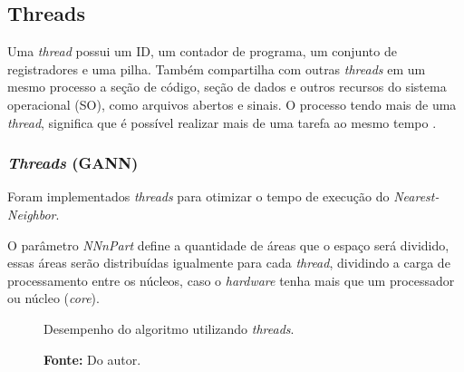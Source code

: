 \documentclass[12pt,openright,a4paper,twoside]{tcc}
\begin{document}
		\subsection{Threads}

		Uma \textit{thread} possui um ID, um contador de programa, um conjunto de registradores e uma pilha. Também compartilha com outras \textit{threads} em um mesmo processo a seção de código, seção de dados e outros recursos do sistema operacional (SO), como arquivos abertos e sinais. 
		O processo tendo mais de uma \textit{thread}, significa que é possível realizar mais de uma tarefa ao mesmo tempo \cite{THREAD}.

			\subsubsection{\textit{Threads} (GANN)}

			Foram implementados \textit{threads} para otimizar o tempo de execução do \textit{Nearest-Neighbor}. 

			O parâmetro \textit{NNnPart} define a quantidade de áreas que o espaço será dividido, essas áreas serão distribuídas igualmente para cada \textit{thread}, dividindo a carga de processamento entre os núcleos, caso o \textit{hardware} tenha mais que um processador ou núcleo (\textit{core}).

			\begin{figure}[h!]
				\centering
                \caption{Desempenho do algoritmo utilizando \textit{threads}.}
				\caption*{\textbf{Fonte:} Do autor.}
				\label{figthread}
			\end{figure}
\end{document}
